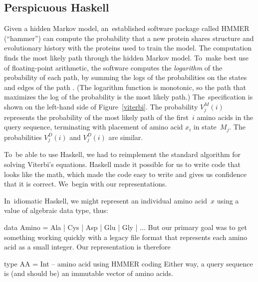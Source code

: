 \documentclass[preprint,nonatbib,blockstyle,nocopyrightspace,times]{sigplanconf}
\newcommand\figref[1]{Figure~\ref{#1}}
\newenvironment{smallverbatim}{\par\small\verbatim}{\endverbatim}
\let\cite\citep
\begin{document}
\subsection{Perspicuous Haskell}

Given a hidden Markov model, 
an~established software package called HMMER (``hammer'') 
can compute the probability
that a new protein shares structure and
evolutionary history with the proteins used to train the model.
The computation finds the most likely path through the hidden Markov model.
To~make best use of floating-point arithmetic, the software computes
the \emph{logarithm} of the probability of each path, by summing
the logs of the 
probabilities on the states and edges of the path \cite{Viterbi:1967hq}.
(The logarithm function is monotonic, so the path that maximizes the
log of the probability is the most likely path.)
The~specification is shown on the left-hand side of \figref{viterbi}.
The probability $V_j^M(i)$ represents the probability of the most
likely path of the first~$i$ amino acids in the query sequence,
terminating with placement of amino acid $x_i$ in state~$M_j$.
The probabilities $V_j^D(i)$ and $V_j^D(i)$ are similar.

To~be able to use Haskell, we had to reimplement the standard
algorithm for solving Viterbi's equations.
Haskell made it possible for us to write code that looks like the
math,
which made the code easy to write and gives us confidence that it is
correct.
We~begin with our representations.

In~idiomatic Haskell, 
we might represent an individual amino acid~$x$
using a value of algebraic data type, thus:
\begin{smallverbatim}
data Amino = Ala | Cys | Asp | Glu | Gly | ...
\end{smallverbatim}
But our primary goal was to get something working quickly with a
legacy file format that represents each amino acid as a small integer.
Our representation is therefore
\begin{smallverbatim}
type AA       = Int -- amino acid using HMMER coding
\end{smallverbatim}
Either way, a query sequence is (and should be) an immutable vector of
amino acids.
\end{document}
